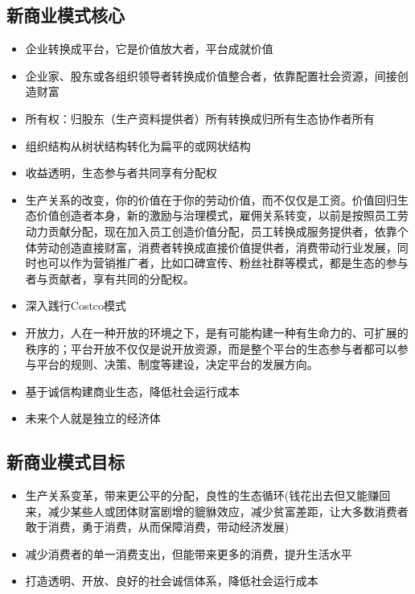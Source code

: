 \documentclass[UTF9]{ctexart}
\begin{document}
\subsection{新商业模式核心}

\begin{itemize}
\item 企业转换成平台，它是价值放大者，平台成就价值
\item 企业家、股东或各组织领导者转换成价值整合者，依靠配置社会资源，间接创造财富
\item 所有权：归股东（生产资料提供者）所有转换成归所有生态协作者所有
\item 组织结构从树状结构转化为扁平的或网状结构
\item 收益透明，生态参与者共同享有分配权
\item 生产关系的改变，你的价值在于你的劳动价值，而不仅仅是工资。价值回归生态价值创造者本身，新的激励与治理模式，雇佣关系转变，以前是按照员工劳动力贡献分配，现在加入员工创造价值分配，员工转换成服务提供者，依靠个体劳动创造直接财富，消费者转换成直接价值提供者，消费带动行业发展，同时也可以作为营销推广者，比如口碑宣传、粉丝社群等模式，都是生态的参与者与贡献者，享有共同的分配权。
\item 深入践行Costco模式
\item 开放力，人在一种开放的环境之下，是有可能构建一种有生命力的、可扩展的秩序的；平台开放不仅仅是说开放资源，而是整个平台的生态参与者都可以参与平台的规则、决策、制度等建设，决定平台的发展方向。
\item 基于诚信构建商业生态，降低社会运行成本
\item 未来个人就是独立的经济体
\end{itemize}

\subsection{新商业模式目标}
\begin{itemize}
\item 生产关系变革，带来更公平的分配，良性的生态循环(钱花出去但又能赚回来，减少某些人或团体财富剧增的貔貅效应，减少贫富差距，让大多数消费者敢于消费，勇于消费，从而保障消费，带动经济发展)
\item 减少消费者的单一消费支出，但能带来更多的消费，提升生活水平
\item 打造透明、开放、良好的社会诚信体系，降低社会运行成本
\end{itemize}

\end{document}
